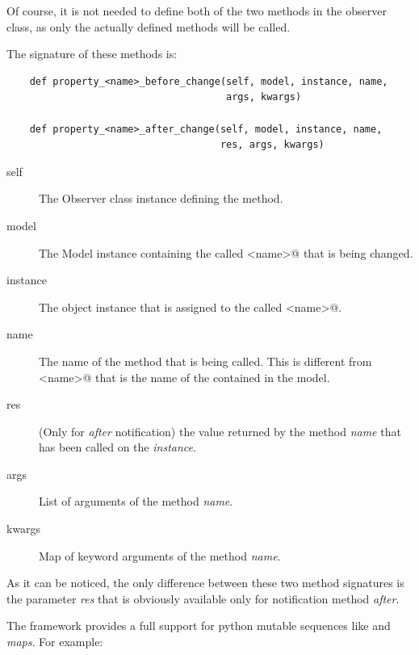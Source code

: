 Of course, it is not needed to define both of the two methods in the
observer class, as only the actually defined methods will be called. 

The signature of these methods is:
{ \codesize 
\begin{verbatim} 
    def property_<name>_before_change(self, model, instance, name,
                                      args, kwargs)

    def property_<name>_after_change(self, model, instance, name, 
                                     res, args, kwargs)
\end{verbatim}
}

\begin{description}
\item[self] The Observer class instance defining the method.
\item[model] The Model instance containing the \OP called
  \verb@<name>@ that is being changed.
\item[instance] The object instance that is assigned to the \OP called
  \verb@<name>@.
\item[name] The name of the method that is being called. This
  is different from \verb@<name>@ that is the name of the \OP
  contained in the model. 
\item[res] (Only for \emph{after} notification) the value returned by
  the method \emph{name} that has been called on the \OP
  \emph{instance}.
\item[args] List of arguments of the method \emph{name}.
\item[kwargs] Map of keyword arguments of the method \emph{name}.
\end{description}

As it can be noticed, the only difference between these two method
signatures is the parameter \emph{res} that is obviously available only
for notification method \emph{after}.

The framework \mvco provides a full support for python mutable
sequences like  and \emph{maps}. For example:


